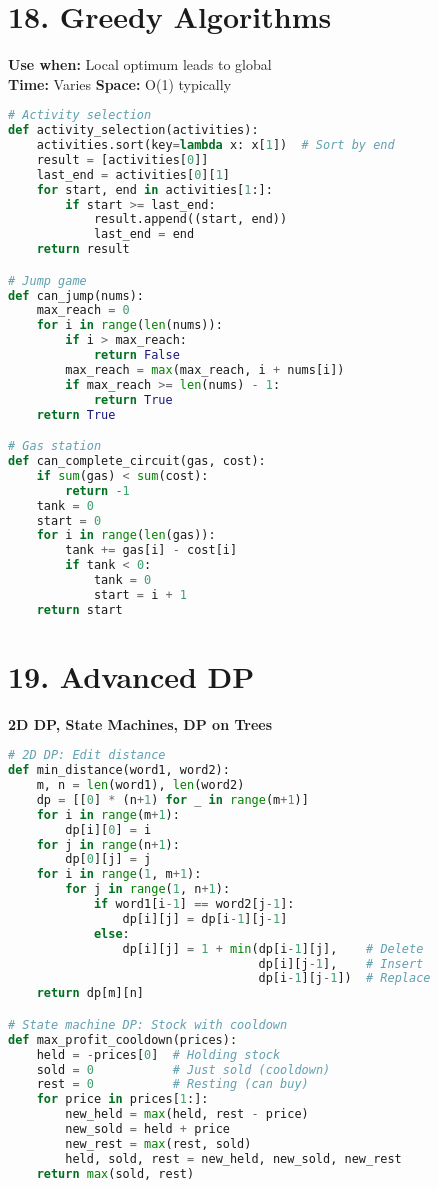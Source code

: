 \documentclass[8pt,landscape]{article}
\begin{document}
\begin{multicols}{3}
\section*{18. Greedy Algorithms}
\textbf{Use when:} Local optimum leads to global \\
\textbf{Time:} Varies \quad \textbf{Space:} O(1) typically
\begin{lstlisting}[language=Python]
# Activity selection
def activity_selection(activities):
    activities.sort(key=lambda x: x[1])  # Sort by end
    result = [activities[0]]
    last_end = activities[0][1]
    for start, end in activities[1:]:
        if start >= last_end:
            result.append((start, end))
            last_end = end
    return result

# Jump game
def can_jump(nums):
    max_reach = 0
    for i in range(len(nums)):
        if i > max_reach:
            return False
        max_reach = max(max_reach, i + nums[i])
        if max_reach >= len(nums) - 1:
            return True
    return True

# Gas station
def can_complete_circuit(gas, cost):
    if sum(gas) < sum(cost):
        return -1
    tank = 0
    start = 0
    for i in range(len(gas)):
        tank += gas[i] - cost[i]
        if tank < 0:
            tank = 0
            start = i + 1
    return start
\end{lstlisting}

\section*{19. Advanced DP}
\textbf{2D DP, State Machines, DP on Trees}
\begin{lstlisting}[language=Python]
# 2D DP: Edit distance
def min_distance(word1, word2):
    m, n = len(word1), len(word2)
    dp = [[0] * (n+1) for _ in range(m+1)]
    for i in range(m+1):
        dp[i][0] = i
    for j in range(n+1):
        dp[0][j] = j
    for i in range(1, m+1):
        for j in range(1, n+1):
            if word1[i-1] == word2[j-1]:
                dp[i][j] = dp[i-1][j-1]
            else:
                dp[i][j] = 1 + min(dp[i-1][j],    # Delete
                                   dp[i][j-1],    # Insert
                                   dp[i-1][j-1])  # Replace
    return dp[m][n]

# State machine DP: Stock with cooldown
def max_profit_cooldown(prices):
    held = -prices[0]  # Holding stock
    sold = 0           # Just sold (cooldown)
    rest = 0           # Resting (can buy)
    for price in prices[1:]:
        new_held = max(held, rest - price)
        new_sold = held + price
        new_rest = max(rest, sold)
        held, sold, rest = new_held, new_sold, new_rest
    return max(sold, rest)


\end{lstlisting}
\end{multicols}
\end{document}
